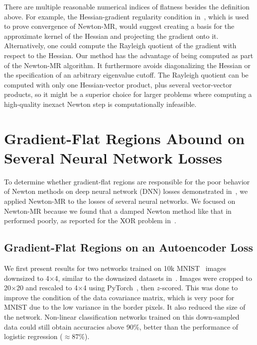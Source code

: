 \documentclass[../../thesis.tex]{subfiles}
\begin{document}
There are multiple reasonable numerical indices of flatness besides
the definition above.
For example,
the Hessian-gradient regularity condition in~\cite{roosta2018},
which is used to prove convergence of Newton-MR,
would suggest creating a basis for the approximate kernel of the Hessian
and projecting the gradient onto it.
Alternatively, one could compute the Rayleigh quotient
of the gradient with respect to the Hessian.
Our method has the advantage of being computed as part of the Newton-MR algorithm.
It furthermore avoids diagonalizing the Hessian or the specification
of an arbitrary eigenvalue cutoff.
The Rayleigh quotient can be computed with only one Hessian-vector product,
plus several vector-vector products,
so it might be a superior choice for larger problems where
computing a high-quality inexact Newton step is computationally infeasible.

\section{Gradient-Flat Regions Abound on Several Neural Network Losses}%

To determine whether gradient-flat regions are
responsible for the poor behavior of Newton methods
on deep neural network (DNN) losses
demonstrated in~,
we applied Newton-MR to the losses of several neural networks.
We focused on Newton-MR because we
found that a damped Newton method like that in~\cite{dauphin2014}
performed poorly, as reported for the XOR problem in~\cite{coetzee1997}.

\subsection{Gradient-Flat Regions on an Autoencoder Loss}

We first present results for two networks
trained on 10k MNIST~\cite{lecun2010} images downsized to 4$\times$4,
similar to the downsized datasets in~\cite{dauphin2014,pennington2017}.
Images were cropped to 20$\times$20 and rescaled to 4$\times$4
using PyTorch~\cite{paszke2019},
then $z$-scored.
This was done to improve the condition of the data covariance matrix,
which is very poor for MNIST due to the low variance in the border pixels.
It also reduced the size of the network.
Non-linear classification networks trained on this down-sampled data
could still obtain accuracies above 90\%,
better than the performance of logistic regression ($\approx87\%$).
\end{document}
